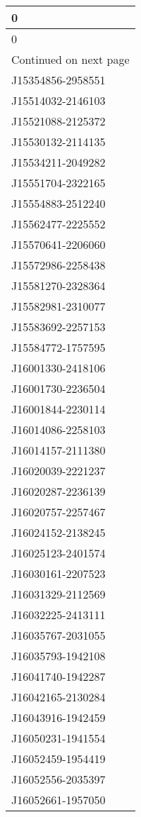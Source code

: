 \begin{longtable}{l}
\toprule
                0 \\
\midrule
\endfirsthead

\toprule
                0 \\
\midrule
\endhead
\midrule
\multicolumn{1}{r}{{Continued on next page}} \\
\midrule
\endfoot

\bottomrule
\endlastfoot
J15354856-2958551 \\
J15514032-2146103 \\
J15521088-2125372 \\
J15530132-2114135 \\
J15534211-2049282 \\
J15551704-2322165 \\
J15554883-2512240 \\
J15562477-2225552 \\
J15570641-2206060 \\
J15572986-2258438 \\
J15581270-2328364 \\
J15582981-2310077 \\
J15583692-2257153 \\
J15584772-1757595 \\
J16001330-2418106 \\
J16001730-2236504 \\
J16001844-2230114 \\
J16014086-2258103 \\
J16014157-2111380 \\
J16020039-2221237 \\
J16020287-2236139 \\
J16020757-2257467 \\
J16024152-2138245 \\
J16025123-2401574 \\
J16030161-2207523 \\
J16031329-2112569 \\
J16032225-2413111 \\
J16035767-2031055 \\
J16035793-1942108 \\
J16041740-1942287 \\
J16042165-2130284 \\
J16043916-1942459 \\
J16050231-1941554 \\
J16052459-1954419 \\
J16052556-2035397 \\
J16052661-1957050 \\

\end{longtable}
